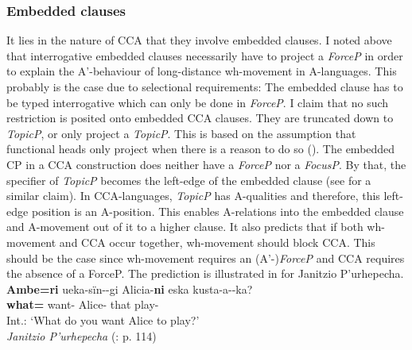 \documentclass[output=paper,colorlinks,citecolor=brown]{langscibook}
\begin{document}
\subsubsection{Embedded clauses} It lies in the nature of CCA that they involve embedded clauses. I noted above that interrogative embedded clauses necessarily have to project a \emph{ForceP} in order to explain the A'-behaviour of long-distance wh-movement in A-languages. This probably is the case due to selectional requirements: The embedded clause has to be typed interrogative which can only be done in \emph{ForceP}. I claim that no such restriction is posited onto embedded CCA clauses. They are truncated down to \emph{TopicP}, or only project a \emph{TopicP}. This is based on the assumption that functional heads only project when there is a reason to do so (\citealp{bovskovic1997syntax}). The embedded CP in a CCA construction does neither have a \emph{ForceP} nor a \emph{FocusP}. By that, the specifier of \emph{TopicP} becomes the left-edge of the embedded clause (see \citealp{csener2008non} for a similar claim). In CCA-languages, \emph{TopicP} has A-qualities and therefore, this left-edge position is an A-position. This enables A-relations into the embedded clause and A-movement out of it to a higher clause. It also predicts that if both wh-movement and CCA occur together, wh-movement should block CCA. This should be the case since wh-movement requires an (A'-)\emph{ForceP} and CCA requires the absence of a ForceP. The prediction is illustrated in \cite{zyman2018rich} for Janitzio P’urhepecha. 
\ea 
\gll * \textquestiondown \textbf{Ambe=ri} ueka-s\"{i}n-\varnothing-gi Alicia-\textbf{ni} eska kusta-a-\varnothing-ka?\\
{} \textbf{what=} want- Alice-\textbf{} that play-\\
\glt Int.: ‘What do you want Alice to play?'\\
\emph{Janitzio P’urhepecha} (\citealp{zyman2018rich}: p. 114)
\z 
\end{document}
